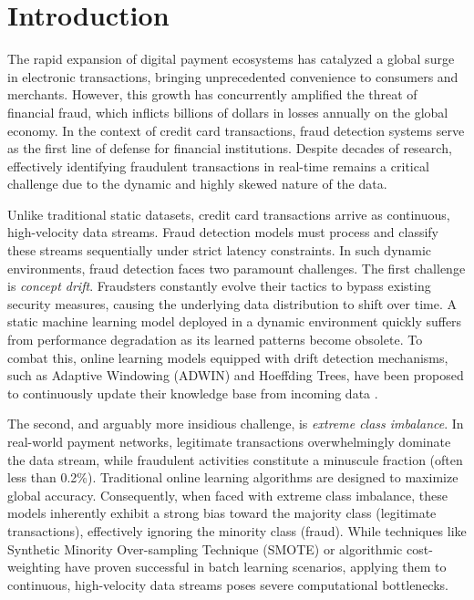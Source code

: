 \section{Introduction}
\label{sec:introduction}

The rapid expansion of digital payment ecosystems has catalyzed a global surge in electronic transactions, bringing unprecedented convenience to consumers and merchants. However, this growth has concurrently amplified the threat of financial fraud, which inflicts billions of dollars in losses annually on the global economy. In the context of credit card transactions, fraud detection systems serve as the first line of defense for financial institutions. Despite decades of research, effectively identifying fraudulent transactions in real-time remains a critical challenge due to the dynamic and highly skewed nature of the data.

Unlike traditional static datasets, credit card transactions arrive as continuous, high-velocity data streams. Fraud detection models must process and classify these streams sequentially under strict latency constraints. In such dynamic environments, fraud detection faces two paramount challenges. The first challenge is \textit{concept drift}. Fraudsters constantly evolve their tactics to bypass existing security measures, causing the underlying data distribution to shift over time. A static machine learning model deployed in a dynamic environment quickly suffers from performance degradation as its learned patterns become obsolete. To combat this, online learning models equipped with drift detection mechanisms, such as Adaptive Windowing (ADWIN) and Hoeffding Trees, have been proposed to continuously update their knowledge base from incoming data \cite{insert_drift_ref}.

The second, and arguably more insidious challenge, is \textit{extreme class imbalance}. In real-world payment networks, legitimate transactions overwhelmingly dominate the data stream, while fraudulent activities constitute a minuscule fraction (often less than 0.2\%). Traditional online learning algorithms are designed to maximize global accuracy. Consequently, when faced with extreme class imbalance, these models inherently exhibit a strong bias toward the majority class (legitimate transactions), effectively ignoring the minority class (fraud). While techniques like Synthetic Minority Over-sampling Technique (SMOTE) or algorithmic cost-weighting have proven successful in batch learning scenarios, applying them to continuous, high-velocity data streams poses severe computational bottlenecks. 

